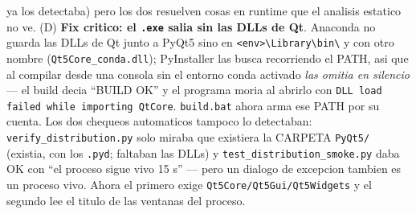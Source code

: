 \documentclass[11pt, a4paper]{article}
\begin{document}
\begin{center}
{    ya los detectaba) pero los dos resuelven cosas en runtime que el analisis
    estatico no ve.
    (D) \textbf{Fix critico: el \texttt{.exe} salia sin las DLLs de Qt}. Anaconda
    no guarda las DLLs de Qt junto a PyQt5 sino en
    \texttt{<env>\textbackslash Library\textbackslash bin\textbackslash} y con
    otro nombre (\texttt{Qt5Core\_conda.dll}); PyInstaller las busca recorriendo
    el PATH, asi que al compilar desde una consola sin el entorno conda activado
    \emph{las omitia en silencio} --- el build decia ``BUILD OK'' y el programa
    moria al abrirlo con \texttt{DLL load failed while importing QtCore}.
    \texttt{build.bat} ahora arma ese PATH por su cuenta. Los dos chequeos
    automaticos tampoco lo detectaban: \texttt{verify\_distribution.py} solo
    miraba que existiera la CARPETA \texttt{PyQt5/} (existia, con los
    \texttt{.pyd}; faltaban las DLLs) y \texttt{test\_distribution\_smoke.py}
    daba OK con ``el proceso sigue vivo 15 s'' --- pero un dialogo de excepcion
    tambien es un proceso vivo. Ahora el primero exige
    \texttt{Qt5Core/Qt5Gui/Qt5Widgets} y el segundo lee el titulo de las ventanas
    del proceso.%
  }
\end{center}
\end{document}

